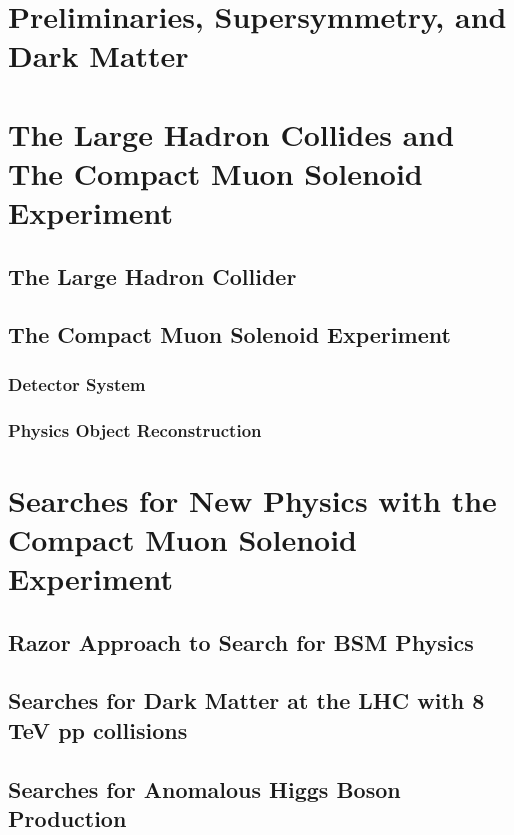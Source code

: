 \documentclass[14pt]{caltech_thesis}
\begin{document}
\tableofcontents
\listoffigures
\listoftables
\printnomenclature

\mainmatter
\part{Preliminaries, Supersymmetry, and Dark Matter}

\part{The Large Hadron Collides and The Compact Muon Solenoid Experiment}
\chapter{The Large Hadron Collider}

\chapter{The Compact Muon Solenoid Experiment}
\section{Detector System}

\section{Physics Object Reconstruction}

\part{ Searches for New Physics with the Compact Muon Solenoid
  Experiment}

\chapter{Razor Approach to Search for BSM Physics}

\chapter{Searches for Dark Matter at the LHC with 8 TeV pp collisions}\label{DMatLHC}

\chapter{Searches for Anomalous Higgs Boson Production}\label{HggRazor}

\end{document}
